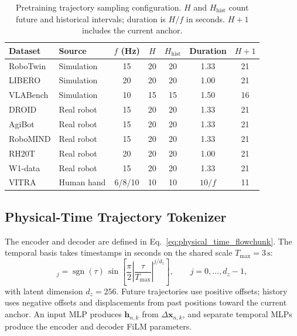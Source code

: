 \begin{table}[!htbp]
    \centering
    \small
    \setlength{\tabcolsep}{5pt}
    \renewcommand{\arraystretch}{1.12}
    \caption{Pretraining trajectory sampling configuration. $H$ and
    $H_{\mathrm{hist}}$ count future and historical intervals; duration is
    $H/f$ in seconds. $H+1$ includes the current anchor.}
    \label{tab:app:temporal}
    \vspace{3pt}
    \begin{tabular}{@{}llccccc@{}}
        \toprule
        Dataset & Source & $f$ (Hz) & $H$ & $H_{\mathrm{hist}}$ & Duration & $H+1$ \\
        \midrule
        RoboTwin & Simulation & 15 & 20 & 20 & 1.33 & 21 \\
        LIBERO & Simulation & 20 & 20 & 20 & 1.00 & 21 \\
        VLABench & Simulation & 10 & 15 & 15 & 1.50 & 16 \\
        DROID & Real robot & 15 & 20 & 20 & 1.33 & 21 \\
        AgiBot & Real robot & 15 & 20 & 20 & 1.33 & 21 \\
        RoboMIND & Real robot & 15 & 20 & 20 & 1.33 & 21 \\
        RH20T & Real robot & 20 & 20 & 20 & 1.00 & 21 \\
        W1-data & Real robot & 15 & 20 & 20 & 1.33 & 21 \\
        VITRA & Human hand & 6/8/10 & 10 & 10 & $10/f$ & 11 \\
        \bottomrule
    \end{tabular}
\end{table}

\subsection{Physical-Time Trajectory Tokenizer}
\label{app:trajectory_tokenizer}

The encoder and decoder are defined in
Eq.~\eqref{eq:physical_time_flowchunk}.
The temporal basis takes timestamps in seconds on the shared scale
$T_{\max}=3\,\mathrm{s}$:
\begin{equation}
    [\boldsymbol\phi_{\mathrm{time}}(\tau)]_j
    =\operatorname{sgn}(\tau)\,
    \sin\!\left[\frac{\pi}{2}
    \left|\frac{\tau}{T_{\max}}\right|^{j/d_z}\right],
    \qquad j=0,\ldots,d_z-1,
\label{eq:tokenizer_time_basis}
\end{equation}
with latent dimension $d_z=256$.
Future trajectories use positive offsets; history uses negative offsets
and displacements from past positions toward the current anchor.
An input MLP produces $\mathbf h_{n,k}$ from $\Delta\mathbf x_{n,k}$, and
separate temporal MLPs produce the encoder and decoder FiLM parameters.


